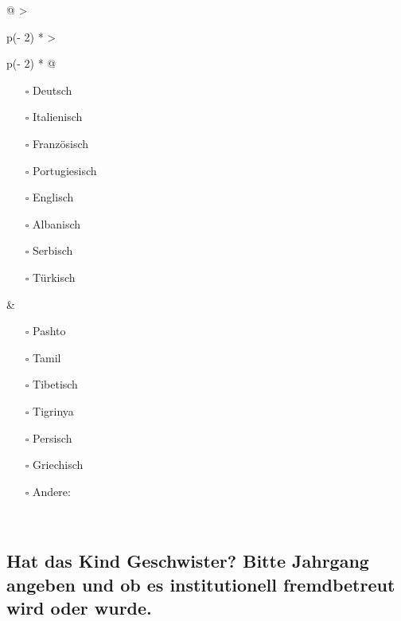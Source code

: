 \documentclass[
  ngerman,
  11pt,
  paper=a4,
  twoside,
  titlepage=true,
  openright,
  abstract=on,
  toc=listofnumbered,
  numbers=noenddot,
  chapterprefix=true,
  headings=optiontohead,
  svgnames,
  dvipsnames]{scrreprt}
\providecommand{\tightlist}{%
  \setlength{\itemsep}{0pt}\setlength{\parskip}{0pt}}
\begin{document}
\begin{longtable}[]{@{}
  >{\raggedright\arraybackslash}p{(\columnwidth - 2\tabcolsep) * }
  >{\raggedright\arraybackslash}p{(\columnwidth - 2\tabcolsep) * }@{}}
\toprule
\endhead
\begin{minipage}[t]{\linewidth}\raggedright
\vspace{0.3cm}

\begin{itemize}
\item[$\square$]
  Deutsch
\item[$\square$]
  Italienisch
\item[$\square$]
  Französisch
\item[$\square$]
  Portugiesisch
\item[$\square$]
  Englisch
\item[$\square$]
  Albanisch
\item[$\square$]
  Serbisch
\item[$\square$]
  Türkisch

  \vspace{0.3cm}
\end{itemize}
\end{minipage} & \begin{minipage}[t]{\linewidth}\raggedright
\vspace{0.3cm}

\begin{itemize}
\tightlist
\item[$\square$]
  Pashto
\item[$\square$]
  Tamil
\item[$\square$]
  Tibetisch
\item[$\square$]
  Tigrinya
\item[$\square$]
  Persisch
\item[$\square$]
  Griechisch
\item[$\square$]
  Andere: \xhrulefill[,fill=3cm,thickness=0.5pt]
\end{itemize}
\end{minipage} \\
\bottomrule
\end{longtable}

\hypertarget{hat-das-kind-geschwister-bitte-jahrgang-angeben-und-ob-es-institutionell-fremdbetreut-wird-oder-wurde.}{%
\subsection*{Hat das Kind Geschwister? Bitte Jahrgang angeben und ob es
institutionell fremdbetreut wird oder
wurde.}\label{hat-das-kind-geschwister-bitte-jahrgang-angeben-und-ob-es-institutionell-fremdbetreut-wird-oder-wurde.}}
\end{document}
